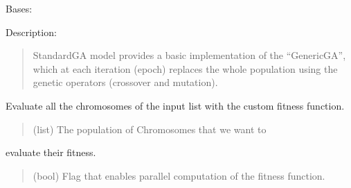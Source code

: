 \documentclass[letterpaper,10pt,english]{sphinxmanual}
\begin{document}
\begin{fulllineitems}
\label{\detokenize{pygenalgo.engines:pygenalgo.engines.standard_ga.StandardGA}}
\pysigstartsignatures
{}
\pysigstopsignatures
\sphinxAtStartPar
Bases: {\hyperref[\detokenize{pygenalgo.engines:pygenalgo.engines.generic_ga.GenericGA}]{}}

\sphinxAtStartPar
Description:
\begin{quote}

\sphinxAtStartPar
StandardGA model provides a basic implementation of the “GenericGA”,
which at each iteration (epoch) replaces the whole population using
the genetic operators (crossover and mutation).
\end{quote}

\begin{fulllineitems}
\label{\detokenize{pygenalgo.engines:pygenalgo.engines.standard_ga.StandardGA.evaluate_fitness}}
\pysigstartsignatures
{}
\pysigstopsignatures
\sphinxAtStartPar
Evaluate all the chromosomes of the input list with the custom fitness function.
\begin{quote}\begin{description}
\sphinxAtStartPar
{} \textendash{} (list) The population of Chromosomes that we want to

\end{description}\end{quote}

\sphinxAtStartPar
evaluate their fitness.
\begin{quote}\begin{description}
\sphinxAtStartPar
{} \textendash{} (bool) Flag that enables parallel computation of the fitness function.


\end{description}
\end{quote}
\end{fulllineitems}
\end{fulllineitems}
\end{document}
